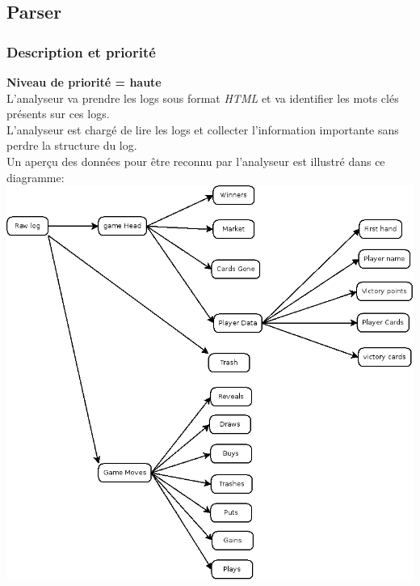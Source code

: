 \documentclass{scrreprt}
\begin{document}
\subsection{Parser}

\subsubsection{Description et priorité}
\textbf{Niveau de priorité = haute}\\
L'analyseur va prendre les logs sous format \textit{HTML} et va identifier les mots clés présents sur ces logs.\\
L'analyseur est chargé de lire les logs et collecter l'information importante sans perdre la structure du log.\\
Un aperçu des données pour être reconnu par l'analyseur est illustré dans ce diagramme:\\
\includegraphics[scale=0.35,keepaspectratio]{UseCaseParser}
\end{document}
